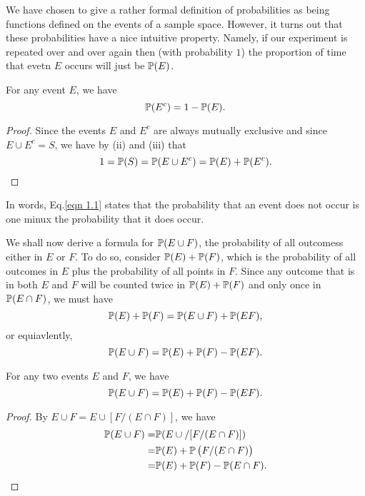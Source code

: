 \begin{remark}
    We have chosen to give a rather formal definition of probabilities as being functions defined on the events of a sample space. However, it turns out that these probabilities have a nice intuitive property. Namely, if our experiment is repeated over and over again then (with probability $1$) the proportion of time that evetn $E$ occurs will just be $\mathbb{P} (E)$.
\end{remark}

\begin{proposition}
    For any event $E$, we have
    \begin{equation}\label{eqn 1.1}
        \mathbb{P} (E^c) = 1 - \mathbb{P} (E).
    \end{equation}
    \begin{proof}
        Since the events $E$ and $E^c$ are always mutually exclusive and since $E \cup E^c = S$, we have by (ii) and (iii) that 
        \begin{equation*}
            1 = \mathbb{P} (S) = \mathbb{P} (E \cup E^c) = \mathbb{P} (E) + \mathbb{P} (E^c).
        \end{equation*}
    \end{proof}
\end{proposition}

\begin{remark}
    In words, Eq.\eqref{eqn 1.1} states that the probability that an event does not occur is one minux the probability that it does occur.
\end{remark}

We shall now derive a formula for $\mathbb{P} (E \cup F)$, the probability of all outcomess either in $E$ or $F$. To do so, consider $\mathbb{P} (E) + \mathbb{P} (F)$, which is the probability of all outcomes in $E$ plus the probability of all points in $F$. Since any outcome that is in both $E$ and $F$ will be counted twice in $\mathbb{P} (E) + \mathbb{P} (F)$ and only once in $\mathbb{P} (E \cap F)$, we must have 
\begin{equation*}
    \mathbb{P} (E) + \mathbb{P} (F) = \mathbb{P} (E \cup F) + \mathbb{P} (EF),
\end{equation*}
or equiavlently, 
\begin{equation*}
    \mathbb{P} (E \cup F) = \mathbb{P} (E) + \mathbb{P}(F) - \mathbb{P} (EF).
\end{equation*}

\begin{proposition}
    For any two events $E$ and $F$, we have 
    \begin{equation}\label{eqn 1.2}
        \mathbb{P} ( E \cup F) = \mathbb{P} (E) + \mathbb{P} (F) - \mathbb{P} (EF).
    \end{equation}
    \begin{proof}
        By $E \cup F = E \cup [F / (E \cap F)]$, we have 
        \begin{align*}
            \mathbb{P} (E \cup F) = & \mathbb{P} (E \cup / [F / (E \cap F)]) \\ 
            = & \mathbb{P} (E) + \mathbb{P} \left(F / (E \cap F)\right) \\ 
            = & \mathbb{P} (E) + \mathbb{P} (F) - \mathbb{P} (E \cap F).
        \end{align*}
    \end{proof}
\end{proposition}

